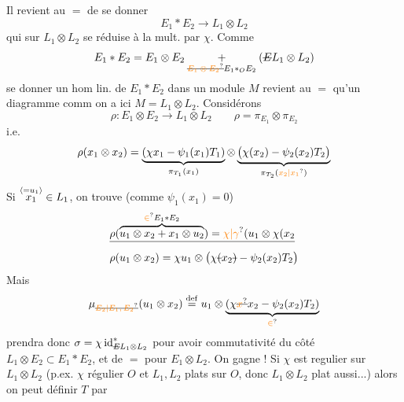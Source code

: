 Il revient au $=$  de se donner
\[
E_1\mathbin{*}E_2\longrightarrow L_1\otimes L_2
\]
qui sur $L_1\otimes L_2$ se réduise à la mult. par $\chi$.
Comme
\[
E_1*E_2=E_1\otimes E_2\mathbin{\underset{\deleted{\unsure{E_1\otimes E_2}}E_1*_{O}E_2}{+}}
(\deleted{E}L_1\otimes L_2)
\]
se donner un hom lin. de $E_1*E_2$ dans un module $M$ revient au $=$ qu'un diagramme comm
 on a ici $M=L_1\otimes L_2$. Considérons
\[
\rho:E_1\otimes E_2\longrightarrow L_1\otimes L_2\qquad \rho=\pi_{E_1}\otimes\pi_{E_2}
\]
i.e.
\[
\rho(x_1\otimes x_2)=
\underbrace{(\chi x_1-\psi_1(x_1)T_1)}_{\pi_{T_1}(x_1)}\otimes
\underbrace{\bigl(\chi(x_2)-\psi_2(x_2)T_2\bigr)}_{\pi_{T_2}(\unsure{x_2|x_1})}
\]
Si $\overset{\inserted{=u_1}}{x_1}\in L_1$, on trouve  (comme $\psi_1(x_1)=0$)
\[
\begin{aligned}
&\deleted{\rho(\overbrace{u_1\otimes x_2+x_1\otimes u_2}^{\unsure{\in} E_1*E_2})=\unsure{\chi|\gamma}(u_1\otimes\chi(x_2}\\
&\rho(u_1\otimes x_2)=\chi u_1\otimes\bigl(\chi\deleted{(}x_2\deleted{)}-\psi_2(x_2)T_2\bigr)
\end{aligned}
\]
Mais
\[
\mu_{\deleted{\unsure{E_2|E_1,E_2}}}(u_1\otimes x_2)\overset{\mathrm{def}}{=}u_1\otimes
\underbrace{(\chi\deleted{\unsure{x}}x_2-\psi_2(x_2)T_2)}_{\unsure{\in}}
\]
 prendra donc $\sigma=\chi\,\mathrm{id}_{\deleted{E}L_1\otimes L_2}^{*}$ pour avoir commutativité du côté $L_1\otimes E_2\subset E_1*E_2$, et de $=$ pour $E_1\otimes L_2$. On gagne !
Si $\chi$ est regulier sur  $L_1\otimes L_2$ (p.ex. $\chi$ régulier  $O$ et $L_1,L_2$ plats sur $O$, donc $L_1\otimes L_2$ plat aussi...) alors on peut définir $T$ par
